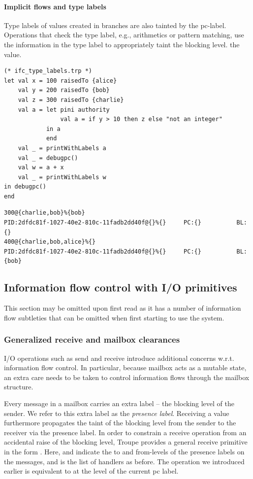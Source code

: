 \paragraph{Implicit flows and type labels}
Type labels of values created in branches are also tainted by the pc-label.
Operations that check the type label, e.g., arithmetics or pattern
matching, use the information in the type label to appropriately taint the blocking level.
the value.
\begin{lstlisting}
(* ifc_type_labels.trp *)
let val x = 100 raisedTo {alice}
    val y = 200 raisedTo {bob}
    val z = 300 raisedTo {charlie}
    val a = let pini authority 
                val a = if y > 10 then z else "not an integer"
            in a 
            end
    val _ = printWithLabels a
    val _ = debugpc()
    val w = a + x
    val _ = printWithLabels w
in debugpc()
end
\end{lstlisting}
\begin{verbatim}
300@{charlie,bob}%{bob}
PID:2dfdc81f-1027-40e2-810c-11fadb2dd40f@{}%{}     PC:{}          BL:{}
400@{charlie,bob,alice}%{}
PID:2dfdc81f-1027-40e2-810c-11fadb2dd40f@{}%{}     PC:{}          BL:{bob}
\end{verbatim}



\subsection{Information flow control with I/O primitives}
This section may be omitted upon first read as it has a number of information flow subtleties that 
can be omitted when first starting to use the system.
\subsubsection{Generalized receive and mailbox clearances}

I/O operations such as send and receive introduce additional concerns w.r.t. 
information flow control. In particular, because mailbox acts as a mutable state, an extra
care needs to be taken to control information flows through the mailbox structure.


Every message in a mailbox carries an extra label -- the blocking level of the sender. We refer to this 
extra label as the \emph{presence label}.
Receiving a value furthermore propagates the taint of the blocking level from the sender to the receiver via the presence label. 
In order to constrain a receive operation from an accidental raise of the blocking level, Troupe
provides a general receive primitive in the form 
. Here,  and 
indicate the to and from-levels of the presence labels on the messages, and  is the list of 
handlers as before.
The  operation we introduced earlier is equivalent to 
at the level of the current pc label.

